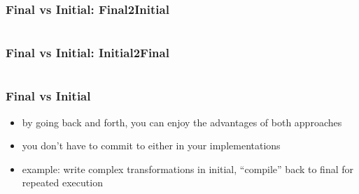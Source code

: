 \documentclass[aspectratio=169, hyperref={colorlinks, linkcolor=beamer@centricgreen}, urlcolor=links]{beamer}
\begin{document}
\begin{frame}[fragile]
  \frametitle{Final vs Initial: Final2Initial}
  \inputminted[fontsize=\footnotesize]{scala}{snippets/final-to-initial.scala}
\end{frame}

\begin{frame}[fragile]
  \frametitle{Final vs Initial: Initial2Final}
  \inputminted[fontsize=\footnotesize]{scala}{snippets/initial-to-final.scala}
\end{frame}

\begin{frame}
  \frametitle{Final vs Initial}
  \begin{itemize}
  \item by going back and forth, you can enjoy the advantages of both approaches
  \item you don't have to commit to either in your implementations
  \item example: write complex transformations in initial, ``compile'' back to final for repeated execution
  \end{itemize}
\end{frame}
\end{document}
